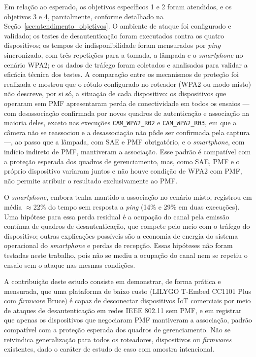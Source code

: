 Em relação ao esperado, os objetivos específicos 1 e 2 foram atendidos, e os objetivos 3 e 4, parcialmente, conforme detalhado na Seção~\ref{sec:atendimento_objetivos}. O ambiente de ataque foi configurado e validado; os testes de desautenticação foram executados contra os quatro dispositivos; os tempos de indisponibilidade foram mensurados por \textit{ping} sincronizado, com três repetições para a tomada, a lâmpada e o \textit{smartphone} no cenário WPA2; e os dados de tráfego foram coletados e analisados para validar a eficácia técnica dos testes. A comparação entre os mecanismos de proteção foi realizada e mostrou que o rótulo configurado no roteador (WPA2 ou modo misto) não descreve, por si só, a situação de cada dispositivo: os dispositivos que operaram sem PMF apresentaram perda de conectividade em todos os ensaios --- com desassociação confirmada por novos quadros de autenticação e associação na maioria deles, exceto nas execuções \texttt{CAM\_WPA2\_R02} e \texttt{CAM\_WPA2\_R03}, em que a câmera não se reassociou e a desassociação não pôde ser confirmada pela captura ---, ao passo que a lâmpada, com SAE e PMF obrigatório, e o \textit{smartphone}, com indício indireto de PMF, mantiveram a associação. Esse padrão é compatível com a proteção esperada dos quadros de gerenciamento, mas, como SAE, PMF e o próprio dispositivo variaram juntos e não houve condição de WPA2 com PMF, não permite atribuir o resultado exclusivamente ao PMF.

O \textit{smartphone}, embora tenha mantido a associação no cenário misto, registrou em média $\approx$22\% do tempo sem resposta a \textit{ping} (14\% e 29\% em duas execuções). Uma hipótese para essa perda residual é a ocupação do canal pela emissão contínua de quadros de desautenticação, que compete pelo meio com o tráfego do dispositivo; outras explicações possíveis são a economia de energia do sistema operacional do \textit{smartphone} e perdas de recepção. Essas hipóteses não foram testadas neste trabalho, pois não se mediu a ocupação do canal nem se repetiu o ensaio sem o ataque nas mesmas condições.



A contribuição deste estudo consiste em demonstrar, de forma prática e mensurada, que uma plataforma de baixo custo (LILYGO T-Embed CC1101 Plus com \textit{firmware} Bruce) é capaz de desconectar dispositivos IoT comerciais por meio de ataques de desautenticação em redes IEEE 802.11 sem PMF, e em registrar que apenas os dispositivos que negociaram PMF mantiveram a associação, padrão compatível com a proteção esperada dos quadros de gerenciamento. Não se reivindica generalização para todos os roteadores, dispositivos ou \textit{firmwares} existentes, dado o caráter de estudo de caso com amostra intencional.


